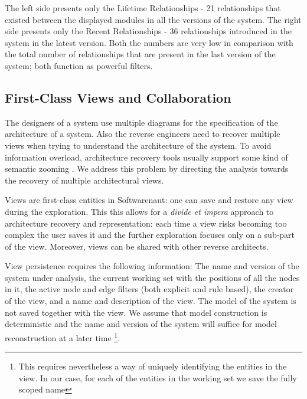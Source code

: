 \documentclass[preprint,12pt]{elsarticle}
\begin{document}
The left side presents only the Lifetime Relationships - 21 relationships that existed between the displayed modules in all the versions of the system. The right side presents only the Recent Relationships - 36 relationships introduced in the system in the latest version. Both the numbers are very low in comparison with the total number of relationships that are present in the last version of the system; both function as powerful filters.

\newpage
\subsection {First-Class Views and Collaboration}

The designers of a system use multiple diagrams for the specification of the architecture of a system. Also the reverse engineers need to recover multiple views when trying to understand the architecture of the system. To avoid information overload, architecture recovery tools usually support some kind of semantic zooming \cite{storey-shrimp}. We address this problem by directing the analysis towards the recovery of multiple architectural views. 

Views are first-class entities in Softwarenaut: one can save and restore any view during the exploration. This this allows for a {\em divide et impera} approach to architecture recovery and representation: each time a view risks becoming too complex the user saves it and the further exploration focuses only on a sub-part of the view. Moreover, views can be shared with other reverse architects.

View persistence requires the following information: The name and version of the system under analysis, the current working set with the positions of all the nodes in it, the active node and edge filters (both explicit and rule based), the creator of the view, and a name and description of the view. The model of the system is not saved together with the view. We assume that model construction is deterministic and the name and version of the system will suffice for model reconstruction at a later time \footnote{This requires nevertheless a way of uniquely identifying the entities in the view. In our case, for each of the entities in the working set we save the fully scoped name}.





\end{document}
